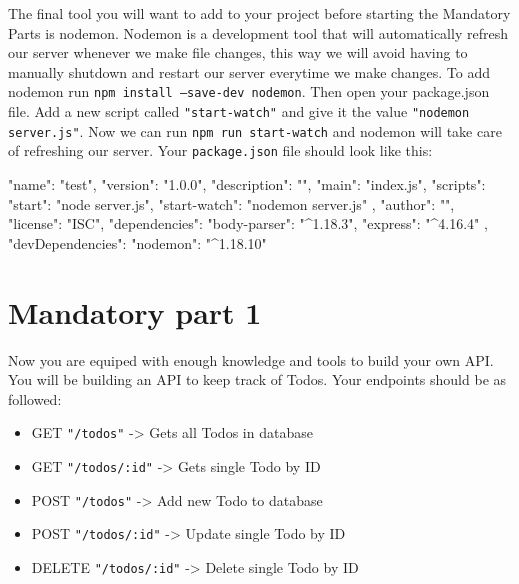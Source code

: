 \documentclass{42-en}
\begin{document}

The final tool you will want to add to your project before starting the Mandatory Parts is nodemon. Nodemon is a development tool that will automatically refresh our server whenever we make file changes, this way we will avoid having to manually shutdown and restart our server everytime we make changes. To add nodemon run \texttt{npm install --save-dev nodemon}. Then open your package.json file. Add a new script called \texttt{"start-watch"} and give it the value \texttt{"nodemon server.js"}. Now we can run \texttt{npm run start-watch} and nodemon will take care of refreshing our server. Your \texttt{package.json} file should look like this:
\begin{42jscode}
{
  "name": "test",
  "version": "1.0.0",
  "description": "",
  "main": "index.js",
  "scripts": {
    "start": "node server.js",
    "start-watch": "nodemon server.js"
  },
  "author": "",
  "license": "ISC",
  "dependencies": {
    "body-parser": "^1.18.3",
    "express": "^4.16.4"
  },
  "devDependencies": {
    "nodemon": "^1.18.10"
  }
}
\end{42jscode}


\newpage
\nextexercice

\chapter{Mandatory part 1}

Now you are equiped with enough knowledge and tools to build your own API. You will be building an API to keep track of Todos. Your endpoints should be as followed:

\begin{itemize}\itemsep1pt
\item GET \texttt{"/todos"} -> Gets all Todos in database
\item GET \texttt{"/todos/:id"} -> Gets single Todo by ID
\item POST \texttt{"/todos"} -> Add new Todo to database
\item POST \texttt{"/todos/:id"} -> Update single Todo by ID
\item DELETE \texttt{"/todos/:id"} -> Delete single Todo by ID
\end{itemize}
\end{document}
